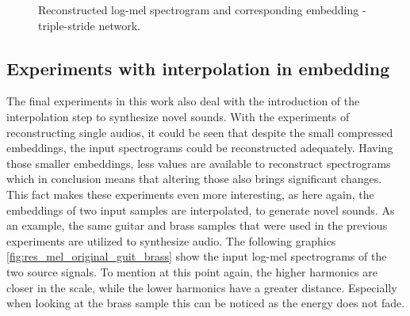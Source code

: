\begin{figure}[htb!]
    \centering
    \captionsetup{justification=centering}
    \caption{Reconstructed log-mel spectrogram and corresponding embedding - triple-stride network.}
    \label{fig:res_mel_triple_str_2D_output_emb}
\end{figure}

\subsection{Experiments with interpolation in embedding}
The final experiments in this work also deal with the introduction of the interpolation step to synthesize novel sounds. With the experiments of reconstructing single audios, it could be seen that despite the small compressed embeddings, the input spectrograms could be reconstructed adequately. Having those smaller embeddings, less values are available to reconstruct spectrograms which in conclusion means that altering those also brings significant changes. This fact makes these experiments even more interesting, as here again, the embeddings of two input samples are interpolated, to generate novel sounds. As an example, the same guitar and brass samples that were used in the previous experiments are utilized to synthesize audio. The following graphics \ref{fig:res_mel_original_guit_brass} show the input log-mel spectrograms of the two source signals. To mention at this point again, the higher harmonics are closer in the scale, while the lower harmonics have a greater distance. Especially when looking at the brass sample this can be noticed as the energy does not fade.

